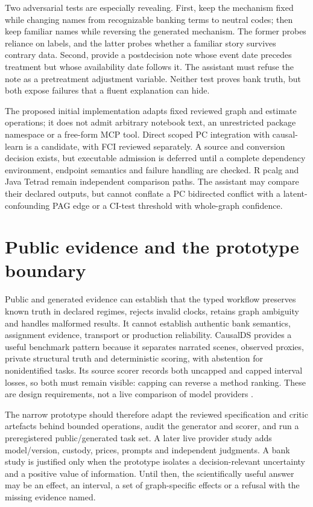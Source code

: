 Two adversarial tests are especially revealing. First, keep the mechanism
fixed while changing names from recognizable banking terms to neutral codes;
then keep familiar names while reversing the generated mechanism. The former
probes reliance on labels, and the latter probes whether a familiar story
survives contrary data. Second, provide a postdecision note whose event date
precedes treatment but whose availability date follows it. The assistant must
refuse the note as a pretreatment adjustment variable. Neither test proves
bank truth, but both expose failures that a fluent explanation can hide.

The proposed initial implementation adapts fixed reviewed graph and estimate
operations; it does not admit arbitrary notebook text, an unrestricted package
namespace or a free-form MCP tool. Direct scoped PC integration with
causal-learn is a candidate, with FCI reviewed separately. A source and
conversion decision exists, but executable admission is deferred until a
complete dependency environment, endpoint semantics and failure handling are
checked. R pcalg and Java Tetrad remain independent comparison paths. The
assistant may compare their declared outputs, but cannot conflate a PC
bidirected conflict with a latent-confounding PAG edge or a CI-test threshold
with whole-graph confidence.

\section{Public evidence and the prototype boundary}

Public and generated evidence can establish that the typed workflow preserves known truth in declared regimes, rejects invalid clocks, retains graph ambiguity and handles malformed results. It cannot establish authentic bank semantics, assignment evidence, transport or production reliability. CausalDS provides a useful benchmark pattern because it separates narrated scenes, observed proxies, private structural truth and deterministic scoring, with abstention for nonidentified tasks. Its source scorer records both uncapped and capped interval losses, so both must remain visible: capping can reverse a method ranking. These are design requirements, not a live comparison of model providers \cite{v12_la_2607_08093}.

The narrow prototype should therefore adapt the reviewed specification and critic artefacts behind bounded operations, audit the generator and scorer, and run a preregistered public/generated task set. A later live provider study adds model/version, custody, prices, prompts and independent judgments. A bank study is justified only when the prototype isolates a decision-relevant uncertainty and a positive value of information. Until then, the scientifically useful answer may be an effect, an interval, a set of graph-specific effects or a refusal with the missing evidence named.
